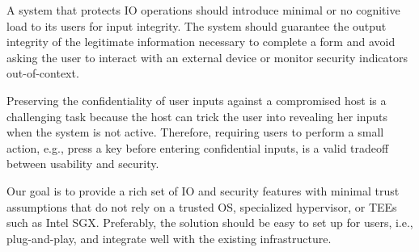 A system that protects IO operations should introduce minimal or no cognitive load to its users for input integrity.
The system should guarantee the output integrity of the legitimate information necessary to complete a form and avoid asking the user to interact with an external device or monitor security indicators out-of-context.


 Preserving the confidentiality of user inputs against a compromised host is a challenging task because the host can trick the user into revealing her inputs when the system is not active. Therefore, requiring users to perform a small action, e.g., press a key before entering confidential inputs, is a valid tradeoff between usability and security.


Our goal is to provide a rich set of IO and security features with minimal trust assumptions that do not rely on a trusted OS, specialized hypervisor, or TEEs such as Intel SGX. Preferably, the solution should be easy to set up for users, i.e., plug-and-play, and integrate well with the existing infrastructure.  
